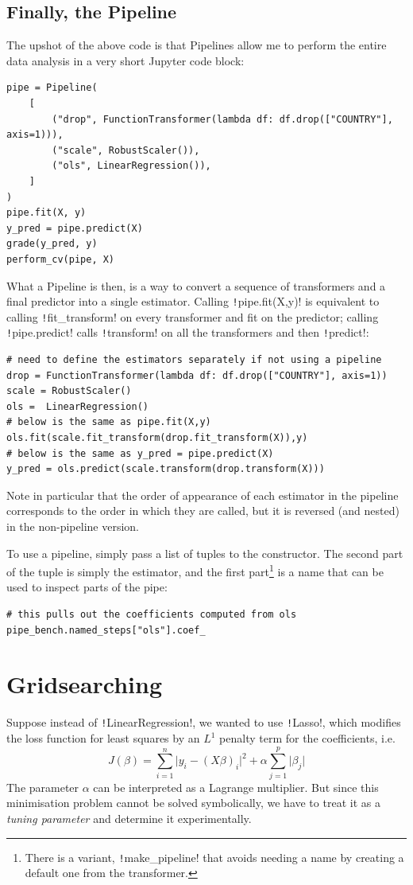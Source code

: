 \documentclass[11pt]{article}
\theoremstyle{definition}
\begin{document}
\subsection{Finally, the Pipeline}
The upshot of the above code is that Pipelines allow me to perform the entire data analysis in a very short Jupyter code block:
\begin{verbatim}
pipe = Pipeline(
    [
        ("drop", FunctionTransformer(lambda df: df.drop(["COUNTRY"], axis=1))),
        ("scale", RobustScaler()),
        ("ols", LinearRegression()),
    ]
)
pipe.fit(X, y)
y_pred = pipe.predict(X)
grade(y_pred, y)
perform_cv(pipe, X)
\end{verbatim}
What a Pipeline is then, is a way to convert a sequence of transformers and a final predictor into a single estimator. 
Calling \texttt!pipe.fit(X,y)! is equivalent to calling \texttt!fit_transform! on every transformer and fit on the predictor; calling \texttt!pipe.predict! calls \texttt!transform! on all the transformers and then \texttt!predict!:
\begin{verbatim}
# need to define the estimators separately if not using a pipeline
drop = FunctionTransformer(lambda df: df.drop(["COUNTRY"], axis=1))
scale = RobustScaler()
ols =  LinearRegression()
# below is the same as pipe.fit(X,y)
ols.fit(scale.fit_transform(drop.fit_transform(X)),y) 
# below is the same as y_pred = pipe.predict(X)
y_pred = ols.predict(scale.transform(drop.transform(X))) 
\end{verbatim}
Note in particular that the order of appearance of each estimator in the pipeline corresponds to the order in which they are called, but it is reversed (and nested) in the non-pipeline version.

To use a pipeline, simply pass a list of tuples to the constructor. The second part of the tuple is simply the estimator, and the first part\footnote{There is a variant, \texttt!make_pipeline! that avoids needing a name by creating a default one from the transformer.
} is a name that can be used to inspect parts of the pipe:
\begin{verbatim}
# this pulls out the coefficients computed from ols
pipe_bench.named_steps["ols"].coef_
\end{verbatim}
\section{Gridsearching}
Suppose instead of \texttt!LinearRegression!, we wanted to use \texttt!Lasso!, which modifies the loss function for least squares by an \(L^1\) penalty term for the coefficients, i.e.
\[ J(\beta) = \sum_{i=1}^n\lvert y_i-(X\beta)_i\rvert^2 + \alpha \sum_{j=1}^p\lvert\beta_j\rvert\]
The parameter \(\alpha\) can be interpreted as a Lagrange multiplier. But since this minimisation problem cannot be solved symbolically, we have to treat it as a \emph{tuning parameter} and determine it experimentally.
\end{document}
